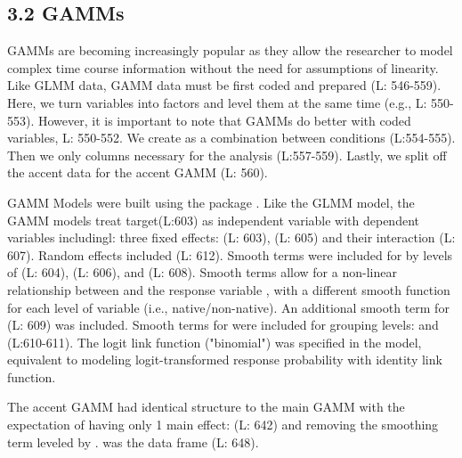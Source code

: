 

\subsection{3.2 GAMMs}
GAMMs are becoming increasingly popular as they allow the researcher to model complex time course information without the need for assumptions of linearity. Like GLMM data, GAMM data must be first coded and prepared (L: 546-559). Here, we turn variables into factors and level them at the same time (e.g., L: 550-553). However, it is important to note that GAMMs do better with coded variables, L: 550-552. We create  as a combination between conditions (L:554-555). Then we only  columns necessary for the analysis (L:557-559). Lastly, we split off the accent data for the accent GAMM (L: 560).



GAMM Models were built using the  package \parencite{mgcv_wood_2017}. Like the GLMM model, the GAMM models treat target(L:603) as independent variable with dependent variables includingl: three fixed effects:  (L: 603),  (L: 605) and their interaction (L: 607). Random effects included  (L: 612). Smooth terms were included for  by levels of  (L: 604),  (L: 606), and  (L: 608). Smooth terms allow for a non-linear relationship between  and the response variable , with a different smooth function for each level of variable (i.e., native/non-native). An additional smooth term for  (L: 609) was included. Smooth terms for  were included for grouping levels:  and  (L:610-611). The logit link function ("binomial") was specified in the model, equivalent to modeling logit-transformed response probability with identity link function.  



The accent GAMM had identical structure to the main GAMM with the expectation of having only 1 main effect:  (L: 642) and removing the smoothing term leveled by .  was the data frame (L: 648).

